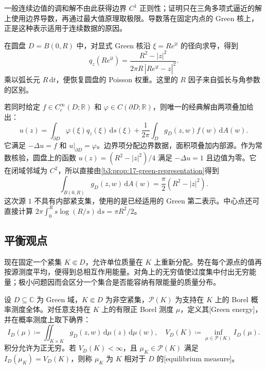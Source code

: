 一般连续边值的调和解不由此获得边界 \(C^1\) 正则性；证明只在三角多项式逼近的解上使用边界导数，再通过最大值原理取极限。导数落在固定内点的 Green 核上，正是这种表示适用于连续数据的原因。

\ProseParagraphBreak

在圆盘 \(D=B(0,R)\) 中，对显式 Green 核沿 \(\xi=Re^{\mathrm it}\) 的径向求导，得到
\[
 q_z(Re^{\mathrm it})
 =\frac{R^2-|z|^2}{2\pi R\,|Re^{\mathrm it}-z|^2}.
\]
乘以弧长元 \(R\,\mathrm dt\)，便恢复圆盘的 Poisson 权重。这里的 \(R\) 因子来自弧长与角参数的区别。

若同时给定 \(f\in C_c^\infty(D;\mathbb R)\) 和 \(\varphi\in C(\partial D;\mathbb R)\)，则唯一的经典解由两项叠加给出：
\[
 u(z)=\int_{\partial D}\varphi(\xi)q_z(\xi)\,\mathrm ds(\xi)
 +\frac1{2\pi}\int_Dg_D(z,w)f(w)\,\mathrm dA(w).
\]
它满足 \(-\Delta u=f\) 和 \(u|_{\partial D}=\varphi\)。边界项分配边界数据，面积项叠加内部源。作为常数核验，圆盘上的函数 \(u(z)=(R^2-|z|^2)/4\) 满足 \(-\Delta u=1\) 且边值为零。它在闭域邻域为 \(C^2\)，所以直接由\cref{b3:prop:17-green-representation}得到
\[
 \int_{B(0,R)}g_D(z,w)\,\mathrm dA(w)
 =\frac\pi2(R^2-|z|^2).
\]
这次源 \(1\) 不具有内部紧支集，使用的是已经适用的 Green 第二表示。中心点还可直接计算 \(2\pi\int_0^R s\log(R/s)\,\mathrm ds=\pi R^2/2\)。

\subsection{平衡观点}
\label{b3:subsec:170403}

现在固定一个紧集 \(K\Subset D\)，允许单位质量在 \(K\) 上重新分配。势在每个源点的值再按源测度平均，便得到总相互作用能量。对角上的无穷值使过度集中付出无穷能量；极小问题因而会区分一个集合是否能容纳有限能量的质量分布。

\begin{definition}\label{b3:def:17-green-energy}
设 \(D\subseteq\mathbb C\) 为 Green 域，\(K\Subset D\) 为非空紧集，\(\mathcal P(K)\) 为支持在 \(K\) 上的 Borel 概率测度全体。对任意支持在 \(K\) 上的有限正 Borel 测度 \(\mu\)，定义其[Green energy]，并在概率测度上取下确界：
\[
 I_D(\mu)\coloneqq\iint_{K\times K}g_D(z,w)\,\mathrm d\mu(z)\,\mathrm d\mu(w),
 \quad V_D(K)\coloneqq\inf_{\mu\in\mathcal P(K)}I_D(\mu).
\]
积分允许为正无穷。若 \(V_D(K)<\infty\)，且 \(\mu_K\in\mathcal P(K)\) 满足 \(I_D(\mu_K)=V_D(K)\)，则称 \(\mu_K\) 为 \(K\) 相对于 \(D\) 的[equilibrium measure]。
\end{definition}

